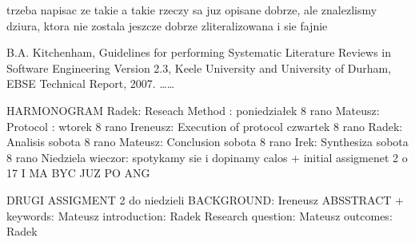 \documentclass[times, 10pt,twocolumn]{article}
\begin{document}
trzeba napisac ze takie a takie rzeczy sa juz opisane dobrze, ale znalezlismy dziura, ktora
nie zostala jeszcze dobrze zliteralizowana i sie fajnie

\noindent [1] B.A. Kitchenham, Guidelines for performing Systematic Literature Reviews in Software Engineering Version 2.3, Keele University and University of Durham, EBSE Technical Report, 2007. \newline
[2] \ldots \newline
[3] \ldots

\nocite{ex1,ex2}
 

HARMONOGRAM
Radek: Reseach Method : poniedziałek 8 rano
Mateusz: Protocol : wtorek 8 rano
Ireneusz: Execution of protocol czwartek 8 rano
Radek: Analisis sobota 8 rano
Mateusz: Conclusion sobota 8 rano
Irek: Synthesiza sobota 8 rano
Niedziela wieczor: spotykamy sie i dopinamy calos + initial assigmenet 2 o 17 I MA BYC JUZ PO ANG


DRUGI
ASSIGMENT 2 do niedzieli
BACKGROUND: Ireneusz
ABSSTRACT + keywords: Mateusz
introduction: Radek
Research question: Mateusz
outcomes: Radek
\end{document}
